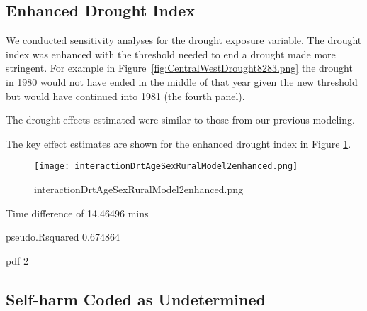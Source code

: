\documentclass[a4paper]{article}                %
\begin{document}




\subsection{Enhanced Drought Index}


        We conducted sensitivity analyses for the drought exposure variable.  The drought index was enhanced with the threshold needed to end a drought made more stringent.  For example in Figure~\ref{fig:CentralWestDrought8283.png} the drought in 1980 would not have ended in the middle of that year given the new threshold but would have continued into 1981 (the fourth panel).

        The drought effects estimated were similar to those from our previous modeling.

        The key effect estimates are shown for the enhanced drought index in Figure \ref{fig:interactionDrtAgeSexRuralModel2enhanced.png}.

        \begin{figure}[!h]
        \centering
        \texttt{[image: interactionDrtAgeSexRuralModel2enhanced.png]}
        \caption{interactionDrtAgeSexRuralModel2enhanced.png}
        \label{fig:interactionDrtAgeSexRuralModel2enhanced.png}
        \end{figure}
        \clearpage


\begin{Schunk}
\begin{Soutput}
Time difference of 14.46496 mins
\end{Soutput}
\begin{Soutput}
pseudo.Rsquared 
       0.674864 
\end{Soutput}
\begin{Soutput}
pdf 
  2 
\end{Soutput}
\end{Schunk}

\subsection{Self-harm Coded as Undetermined}
\end{document}
